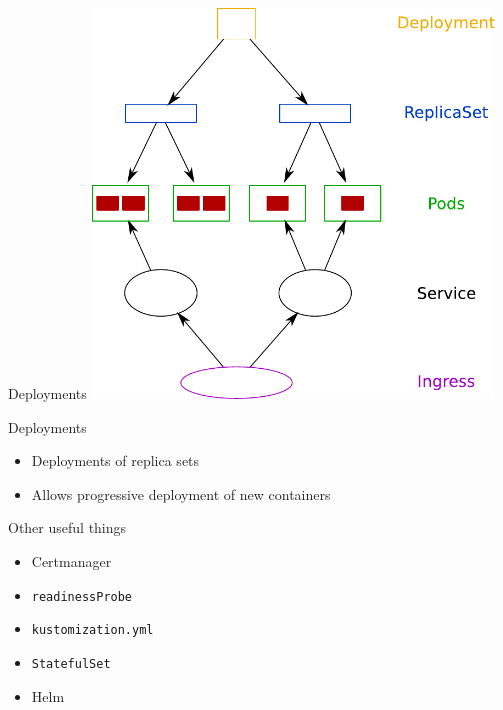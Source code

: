 \documentclass{dcpresentation}
\begin{document}
 
 \begin{frame}{Deployments}
  \centering
  \includegraphics[width=0.8\textwidth]{img/arch-psird.pdf}
 \end{frame}

 \begin{frame}{Deployments}
  \begin{itemize}
   \item Deployments of replica sets
   \item Allows progressive deployment of new containers
  \end{itemize}
 \end{frame}
 
 \begin{frame}{Other useful things}
  \begin{itemize}
   \item Certmanager
   \item \texttt{readinessProbe}
   \item \texttt{kustomization.yml}
   \item \texttt{StatefulSet}
   \item Helm
  \end{itemize}
 \end{frame}
\end{document}

